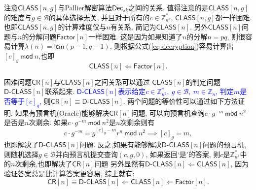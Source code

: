 \documentclass{article}
\newcommand{\Z}{\mathbb{Z}}
\newcommand{\blue}{\textcolor{blue}}
\begin{document}
注意$\textsf{CLASS}[n, g]$与Pallier解密算法$\textsf{Dec}_{sk}$之间的关系.
值得注意的是$\textsf{CLASS}[n, g]$的难度与$g\in\mathcal{B}$的具体选择无关,
并且对于所有的$c\in\Z_{n^2}^*$, $\textsf{CLASS}[n, g]$都一样困难.
也即$\textsf{CLASS}[n, g]$的计算难度仅与$n$有关系, 简记为$\textsf{CLASS}[n]$.
另外$\textsf{CLASS}[n]$问题与$n$的分解问题$\textsf{Factor}[n]$一样困难.
这是因为如果知道了$n$的分解$n = pq$, 则很容易计算$\lambda(n) = \textsf{lcm}(p-1, q-1)$,
则根据公式(\ref{eq-decryption})容易计算出 $[c]_g ~\textsf{mod}~ n$,也即
$$
\textsf{CLASS}[n] \Leftarrow \textsf{Factor}[n].
$$

困难问题$\textsf{CR}[n]$与$\textsf{CLASS}[n]$之间关系可以通过
$\textsf{CLASS}[n]$的判定问题$\textsf{D-CLASS}[n]$联系起来.
\blue{$\textsf{D-CLASS}[n]$表示给定$c\in\Z_{n^2}^*,\ g\in\mathcal{B},\  m\in\Z_n$,
判定$m$是否等于$[c]_g$, }则$\textsf{CR}[n]\equiv\textsf{D-CLASS}[n]$.
两个问题的等价性可以通过如下方法证明.
如果有预言机(Oracle)能够解决$\textsf{CR}[n]$问题,
可以向预言机查询$c\cdot g^{-m}~\textsf{mod}~n^2$是否是$n$次剩余.
如果$c\cdot g^{-m}~\textsf{mod}~n^2$是$n$次剩余则有
$$
c\cdot g^{-m} = g^{[c]_g-m}r^{n}~\textsf{mod}~n^2\implies [c]_g = m,
$$
也即解决了$\textsf{D-CLASS}[n]$问题.
反之,如果有能够解决$\textsf{D-CLASS}[n]$问题的预言机, 
则随机选择$g\in\mathcal{B}$并向预言机提交查询$(c,g,0)$,
如果返回`是'的答案, 则$c$是$\Z_{n^2}^*$中的$n$次剩余,也即解决了$\textsf{CR}[n]$问题
另外显然有$\textsf{D-CLASS}[n]\Leftarrow\textsf{CLASS}[n]$, 
因为验证答案总是比计算答案更容易, 综上就有:
$$
\textsf{CR}[n] \equiv \textsf{D-CLASS}[n] \Leftarrow \textsf{CLASS}[n] \Leftarrow \textsf{Factor}[n].
$$
\end{document}
